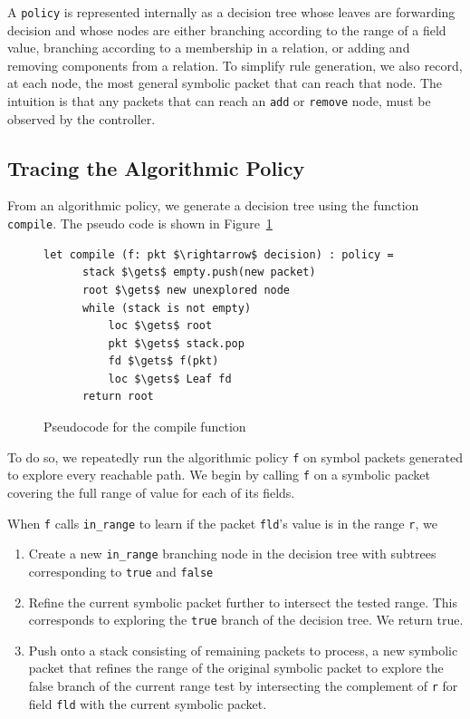 \documentclass[preprint]{sigplanconf}
\begin{document}
A \lstinline|policy| is represented internally as a decision tree whose leaves are forwarding decision and whose nodes are either branching according to the range of a field value, branching according to a membership in a relation, or adding and removing components from a relation. To simplify rule generation, we also record, at each node, the most general symbolic packet that can reach that node. The intuition is that any packets that can reach an \lstinline|add| or \lstinline|remove| node, must be observed by the controller.


\subsection*{Tracing the Algorithmic Policy}
From an algorithmic policy, we generate a decision tree using the function \lstinline|compile|. The pseudo code is shown in Figure~\ref{fig:compile-pseudo}

\begin{figure}[ht]
\begin{lstlisting}[mathescape]
let compile (f: pkt $\rightarrow$ decision) : policy =
      stack $\gets$ empty.push(new packet)
      root $\gets$ new unexplored node
      while (stack is not empty)
          loc $\gets$ root
          pkt $\gets$ stack.pop
          fd $\gets$ f(pkt) 
          loc $\gets$ Leaf fd
      return root    
\end{lstlisting}
\caption{Pseudocode for the compile function}
\label{fig:compile-pseudo}
\end{figure}

To do so, we repeatedly run the algorithmic policy \lstinline|f| on symbol packets generated to explore every reachable path.
We begin by calling \lstinline|f| on a symbolic packet covering the full range of value for each of its fields.

When \lstinline|f| calls \lstinline|in_range| to learn if the packet \lstinline|fld|'s value is in the range \lstinline|r|, we
\begin{enumerate}
\item  Create a new \lstinline|in_range| branching node in the decision tree with subtrees corresponding to \lstinline|true| and \lstinline|false|
\item Refine the current symbolic packet further to intersect the tested range. This corresponds to exploring the \lstinline|true| branch of the decision tree. We return true. 
\item Push onto a stack consisting of remaining packets to process, a new symbolic packet that refines the range of the original symbolic packet to explore the false branch of the current range test by intersecting the complement of \lstinline|r| for field \lstinline|fld| with the current symbolic packet.
\end{enumerate}
\end{document}
